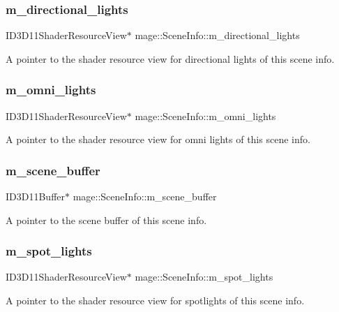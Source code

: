 \subsubsection{\texorpdfstring{m\+\_\+directional\+\_\+lights}{m\_directional\_lights}}
{\footnotesize\ttfamily I\+D3\+D11\+Shader\+Resource\+View$\ast$ mage\+::\+Scene\+Info\+::m\+\_\+directional\+\_\+lights}

A pointer to the shader resource view for directional lights of this scene info. \hypertarget{structmage_1_1_scene_info_adff390c6f7b8aee3cee4d799cfe10ea7}{}\label{structmage_1_1_scene_info_adff390c6f7b8aee3cee4d799cfe10ea7} 
\subsubsection{\texorpdfstring{m\+\_\+omni\+\_\+lights}{m\_omni\_lights}}
{\footnotesize\ttfamily I\+D3\+D11\+Shader\+Resource\+View$\ast$ mage\+::\+Scene\+Info\+::m\+\_\+omni\+\_\+lights}

A pointer to the shader resource view for omni lights of this scene info. \hypertarget{structmage_1_1_scene_info_a9f2dda2382ece506438684848c019447}{}\label{structmage_1_1_scene_info_a9f2dda2382ece506438684848c019447} 
\subsubsection{\texorpdfstring{m\+\_\+scene\+\_\+buffer}{m\_scene\_buffer}}
{\footnotesize\ttfamily I\+D3\+D11\+Buffer$\ast$ mage\+::\+Scene\+Info\+::m\+\_\+scene\+\_\+buffer}

A pointer to the scene buffer of this scene info. \hypertarget{structmage_1_1_scene_info_a531d21ed313faf3c786501d04dd62289}{}\label{structmage_1_1_scene_info_a531d21ed313faf3c786501d04dd62289} 
\subsubsection{\texorpdfstring{m\+\_\+spot\+\_\+lights}{m\_spot\_lights}}
{\footnotesize\ttfamily I\+D3\+D11\+Shader\+Resource\+View$\ast$ mage\+::\+Scene\+Info\+::m\+\_\+spot\+\_\+lights}

A pointer to the shader resource view for spotlights of this scene info. 